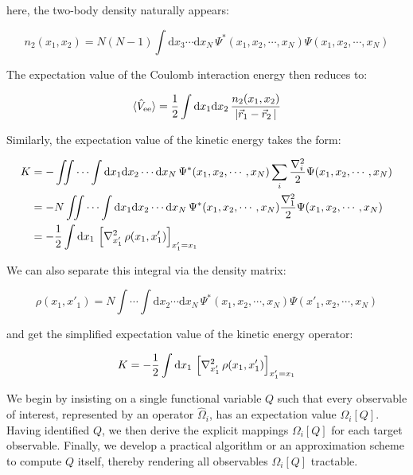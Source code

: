 here, the two-body density naturally appears:

\begin{equation}
    n_2(x_1,x_2)=N(N-1)\int\mathrm{d}x_3\cdots\mathrm{d}x_N\,\Psi^*(x_1,x_2,\cdots,x_N)\Psi(x_1,x_2,\cdots,x_N)
\label{two-body_density}
\end{equation}

The expectation value of the Coulomb interaction energy then reduces to:

\begin{equation}
    \braket{\hat{V}_\mathrm{ee}}=\frac{1}{2}\int\mathrm{d}x_1\mathrm{d}x_2\,
    \frac{n_2(x_1,x_2)}{|\vec{r}_1-\vec{r}_2\,|}
\label{observables_two-body_density}
\end{equation}

Similarly, the expectation value of the kinetic energy takes the form:

\begin{equation}
\begin{aligned}
    K
    &= -\iint\cdots\int \mathrm{d}x_1\mathrm{d}x_2\cdots\mathrm{d}x_N\,
    \Psi^*(x_1,x_2,\cdots,x_N)\sum_i\frac{\nabla_i^2}{2}\Psi(x_1,x_2,\cdots,x_N) \\
    &= -N\iint\cdots\int \mathrm{d}x_1\mathrm{d}x_2\cdots\mathrm{d}x_N\,
    \Psi^*(x_1,x_2,\cdots,x_N)\frac{\nabla_1^2}{2}\Psi(x_1,x_2,\cdots,x_N) \\
    &= -\frac{1}{2}\int\mathrm{d}{x_1}\,
    \left[\nabla_{x'_1}^{2}\,\rho(x_1,x'_1)\right]_{x'_1=x_1}
\end{aligned}
\label{kinetic_energy}
\end{equation}

We can also separate this integral via the density matrix:

\begin{equation}
    \rho(x_1,x'_1)
    = N\int\cdots\int\mathrm{d}x_2\cdots\mathrm{d}x_N\,\Psi^*(x_1,x_2,\cdots,x_N)\Psi(x'_1,x_2,\cdots,x_N) 
\label{density_matrix}
\end{equation}

and get the simplified expectation value of the kinetic energy operator:

\begin{equation}
    K = -\frac{1}{2}\int\mathrm{d}{x_1}\,\left[\nabla_{x'_1}^{2}\,\rho(x_1,x'_1)\right]_{x'_1=x_1}
\label{kinetic_energy_density_matrix}
\end{equation}

We begin by insisting on a single functional variable $Q$ such that every observable of interest, represented by an operator $\hat\Omega_i$, has an expectation value $\Omega_i[Q]$.
Having identified $Q$, we then derive the explicit mappings $\Omega_i[Q]$ for each target observable.
Finally, we develop a practical algorithm or an approximation scheme to compute $Q$ itself, thereby rendering all observables $\Omega_i[Q]$ tractable.

